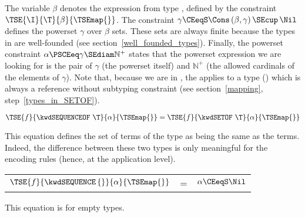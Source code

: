 The variable $\beta$ denotes the expression from type \T{}, defined
by the constraint $\TSE{\I}{\T}{\beta}{\TSEmap{}}$. The constraint
$\gamma \CEeqS \Cons \, (\beta, \gamma) \, \SEcup \, \Nil$
defines the powerset $\gamma$ over $\beta$ sets. These sets are always
finite because the types in \core are well-founded (see
section~\ref{well_founded_types}). Finally, the powerset constraint
$\alpha \PSCEeq \gamma \SEdiam \mathbb{N}^{+}$ states that the powerset
expression we are looking for is the pair of $\gamma$ (the
powerset itself) and $\mathbb{N}^{+}$ (the allowed cardinals of the
elements of $\gamma$). Note that, because we are in \core, the
\kwdSETOF{} applies to a type (\T) which is always a reference without
subtyping constraint (see section~\ref{mapping},
step~\ref{types_in_SETOF}).

\begin{center}
$\TSE{f}{\kwdSEQUENCEOF \,\, \T}{\alpha}{\TSEmap{}}
 = \TSE{f}{\kwdSETOF \,\, \T}{\alpha}{\TSEmap{}}$
\end{center}

This equation defines the set of terms of the \kwdSEQUENCEOF{} type as
being the same as the \kwdSETOF{} terms. Indeed, the difference
between these two types is only meaningful for the encoding rules
(hence, at the application level).

\begin{center}
\begin{tabular}{rcl} 
    $\TSE{f}{\kwdSEQUENCE \, \{\}}{\alpha}{\TSEmap{}}$
  & \hspace*{-4mm} = 
  & \hspace*{-4mm}
    $\alpha \CEeqS \Nil$
\end{tabular}
\end{center}

\noindent
This equation is for empty \kwdSEQUENCE{} types.

\medskip

